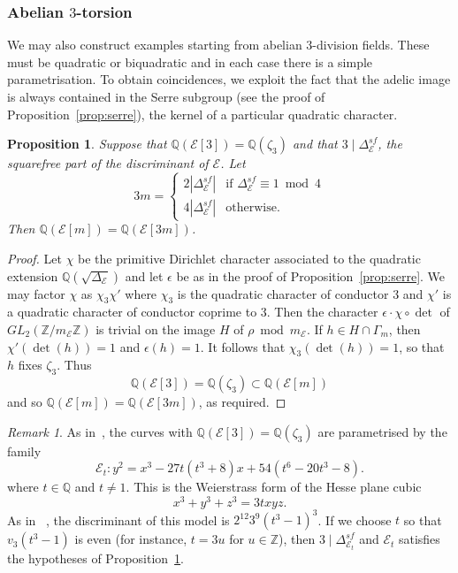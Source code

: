 \documentclass{amsart}
\theoremstyle{plain}
\newtheorem{prop}[theorem]{Proposition}
\theoremstyle{remark}
\newtheorem{remark}[theorem]{Remark}
\newcommand{\Q}{\mathbb{Q}}
\newcommand{\Z}{\mathbb{Z}}
\newcommand{\E}{\mathcal{E}}
\begin{document}
\subsubsection{Abelian $3$-torsion}

We may also construct examples starting from abelian $3$-division fields. These must be quadratic or biquadratic and in
each case there is a simple parametrisation. To obtain coincidences, we exploit the fact that the adelic image is always
contained in the Serre subgroup (see the proof of Proposition~\ref{prop:serre}), the kernel of a particular quadratic
character.

\begin{prop}\label{prop:min-three-torsion} Suppose that $\Q(\E[3])= \Q(\zeta_3)$ and that $3 \mid \Delta_\E^{sf}$, the
  squarefree part of the discriminant of $\E$. Let
\[3m = \begin{cases} 2 |\Delta_\E^{sf}| & \text{if $\Delta_\E^{sf} \equiv 1 \bmod 4$} \\
4 |\Delta_\E^{sf}| & \text{otherwise.}
    \end{cases}\]
Then $\Q(\E[m]) = \Q(\E[3m])$.
\end{prop}
\begin{proof}
  Let $\chi$ be the primitive Dirichlet character associated to the quadratic extension $\Q(\sqrt{\Delta_\E})$ and let
  $\epsilon$ be as in the proof of Proposition~\ref{prop:serre}. We may factor $\chi$ as $\chi_3 \chi'$ where $\chi_3$ is
  the quadratic character of conductor 3 and $\chi'$ is a quadratic character of conductor coprime to 3. Then the
  character $\epsilon \cdot \chi\circ \det$ of $GL_2(\Z/m_\E\Z)$ is trivial on the image $H$ of $\rho \bmod m_\E$. If
  $h \in H \cap \Gamma_m$, then $\chi'(\det(h)) = 1$ and $\epsilon(h) = 1$. It follows that $\chi_3(\det(h)) = 1$, so
  that $h$ fixes $\zeta_3$. Thus
    \[\Q(\E[3]) = \Q(\zeta_3) \subset \Q(\E[m])\]
    and so $\Q(\E[m]) = \Q(\E[3m])$, as required.
\end{proof}

\begin{remark}\label{rem:hesse}
  As in~\cite[Section~6.2]{gonzalez-jimenezEllipticCurvesAbelian2016}, the curves with
  $\Q(\E[3])=\Q(\zeta_3)$ are parametrised by the family
  \[
    \E_t : y^2 = x^3 - 27t(t^3+8)x + 54(t^6-20t^3-8).
  \]
  where $t \in \Q$ and $t \ne 1$. This is the Weierstrass form of the Hesse plane cubic
  \[
    x^3 + y^3 + z^3 = 3txyz.
  \]
  As in
  ~\cite{joyeHessianEllipticCurves2001}, the discriminant of this model is $2^{12}3^9(t^3-1)^3$. If we choose $t$ so that
  $v_3(t^3 - 1)$ is even (for instance, $t = 3u$ for $u \in \Z$), then $3 \mid \Delta_{\E_t}^{sf}$ and $\E_t$ satisfies the hypotheses of
  Proposition~\ref{prop:min-three-torsion}.
\end{remark}
\end{document}
